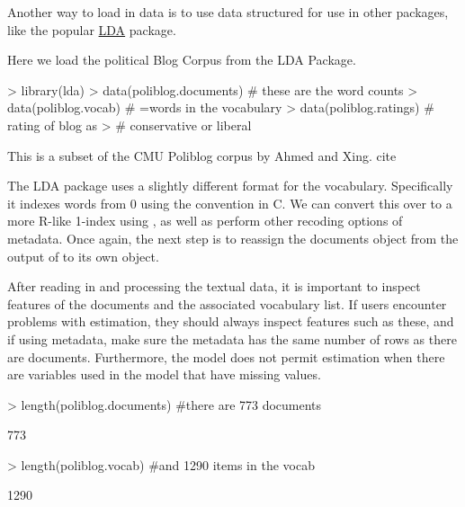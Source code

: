 \documentclass[nojss]{jss}
\begin{document}
Another way to load in data is to use data structured for use in other packages, like the popular \href{http://cran.r-project.org/web/packages/lda/}{LDA} package.

Here we load the political Blog Corpus from the LDA Package.
\begin{Schunk}
\begin{Sinput}
> library(lda)
> data(poliblog.documents) # these are the word counts
> data(poliblog.vocab)     # =words in the vocabulary
> data(poliblog.ratings)   # rating of blog as
>                          # conservative or liberal
\end{Sinput}
\end{Schunk}
This is a subset of the CMU Poliblog corpus by Ahmed and Xing. cite

The LDA package uses a slightly different format for the vocabulary. Specifically it indexes words from 0 using the convention in C. We can convert this over to a more R-like 1-index using , as well as perform other recoding options of metadata. Once again, the next step is to reassign the documents object from the output of  to its own object.

\begin{Schunk}
\end{Schunk}



After reading in and processing the textual data, it is important to inspect features of the documents and the associated vocabulary list. If users encounter problems with estimation, they should always inspect features such as these, and if using metadata, make sure the metadata has the same number of rows as there are documents. Furthermore, the model does not permit estimation when there are variables used in the model that have missing values.

\begin{Schunk}
\begin{Sinput}
> length(poliblog.documents) #there are 773 documents
\end{Sinput}
\begin{Soutput}
[1] 773
\end{Soutput}
\begin{Sinput}
> length(poliblog.vocab)     #and 1290 items in the vocab
\end{Sinput}
\begin{Soutput}
[1] 1290
\end{Soutput}
\end{Schunk}
\end{document}
